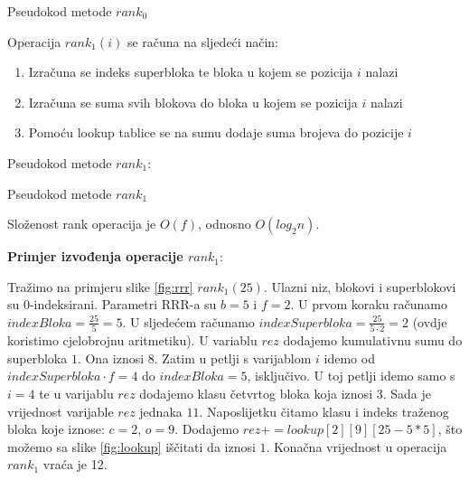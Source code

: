 \documentclass[times, utf8, seminar, numeric]{fer}
\begin{document}
\begin{algorithm}[H]
 \caption{Pseudokod metode $rank_0$}
\end{algorithm}


Operacija $rank_1(i)$ se računa na sljedeći način:
\begin{enumerate}
	\item Izračuna se indeks superbloka te bloka u kojem se pozicija $i$ nalazi
	\item Izračuna se suma svih blokova do bloka u kojem se pozicija $i$ nalazi
	\item Pomoću lookup tablice se na sumu dodaje suma brojeva do pozicije $i$
\end{enumerate}
Pseudokod metode $rank_1$:

\begin{algorithm}[H]
 \caption{Pseudokod metode $rank_1$}
\end{algorithm}

Složenost rank operacija je $O(f)$, odnosno $O(log_2n)$.

\textbf{Primjer izvođenja operacije $rank_1$}:

Tražimo na primjeru slike \ref{fig:rrr} $rank_1(25)$. Ulazni niz, blokovi i superblokovi su 0-indeksirani. Parametri RRR-a su $b=5$ i $f=2$. U prvom koraku računamo $indexBloka=\frac{25}{5}=5$.  U sljedećem računamo $indexSuperbloka=\frac{25}{5 \cdot 2}=2$ (ovdje koristimo cjelobrojnu aritmetiku). U variablu $rez$ dodajemo kumulativnu sumu do superbloka $1$. Ona iznosi $8$. Zatim u petlji s varijablom $i$ idemo od $indexSuperbloka \cdot f=4$ do $indexBloka=5$, isključivo. U toj petlji idemo samo s $i=4$ te u varijablu $rez$ dodajemo klasu četvrtog bloka koja iznosi $3$. Sada je vrijednost varijable $rez$ jednaka $11$. Naposlijetku čitamo klasu i indeks traženog bloka koje iznose: $c=2$, $o=9$. Dodajemo $rez+=lookup[2][9][25-5*5]$, što možemo sa slike \ref{fig:lookup} iščitati da iznosi $1$. Konačna vrijednost u operacija $rank_1$ vraća je 12. 
\end{document}
